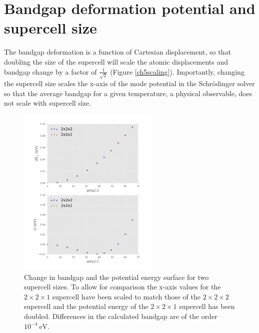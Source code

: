 \chapter{\label{app:6-SCcompare}Bandgap deformation potential and supercell size}

The bandgap deformation is a function of Cartesian displacement, so that doubling the size of the supercell will scale the atomic displacements and bandgap change by a factor of $\frac{1}{\sqrt{2}}$ (Figure \ref{ch5scaling}).  %
Importantly, changing the supercell size scales the x-axis of the mode potential in the Schr\"{o}dinger solver so that the average bandgap for a given temperature, a physical observable, does not scale with supercell size.

\begin{figure}[]
\includegraphics[width=0.6\textwidth]{figures/ch5/SCcompare.png} \centering 
\caption[Bandgap deformation potential and supercell size]{
Change in bandgap and the potential energy surface for two supercell sizes. To allow for comparison the x-axis values for the $2\times2\times1$ supercell have been scaled to match those of the $2\times2\times2$ supercell and the potential energy of the $2\times2\times1$ supercell has been doubled.  Differences in the calculated bandgap are of the order $10^{−4}\ \textrm{eV}$.
}
\end{figure}

